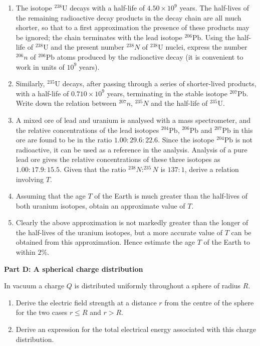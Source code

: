 \begin{enumerate}
\item[(a)] The isotope $^{238}\mathrm{U}$ decays with a half-life of $4.50\times10^{9}$ years. The half-lives of the remaining radioactive decay products in the decay chain are all much shorter, so that to a first approximation the presence of these products may be ignored; the chain terminates with the lead isotope $^{206}\mathrm{Pb}$. Using the half-life of $^{238}\mathrm{U}$ and the present number $^{238}N$ of $^{238}\mathrm{U}$ nuclei, express the number $^{206}n$ of $^{206}\mathrm{Pb}$ atoms produced by the radioactive decay (it is convenient to work in units of $10^{9}$ years).
\item[(b)] Similarly, $^{235}\mathrm{U}$ decays, after passing through a series of shorter-lived products, with a half-life of $0.710\times10^{9}$ years, terminating in the stable isotope $^{207}\mathrm{Pb}$. Write down the relation between $^{207}n$, $^{235}N$ and the half-life of $^{235}\mathrm{U}$.
\item[(c)] A mixed ore of lead and uranium is analysed with a mass spectrometer, and the relative concentrations of the lead isotopes $^{204}\mathrm{Pb}$, $^{206}\mathrm{Pb}$ and $^{207}\mathrm{Pb}$ in this ore are found to be in the ratio $1.00:29.6:22.6$. Since the isotope $^{204}\mathrm{Pb}$ is not radioactive, it can be used as a reference in the analysis. Analysis of a pure lead ore gives the relative concentrations of these three isotopes as $1.00:17.9:15.5$. Given that the ratio $^{238}N:^{235}N$ is $137:1$, derive a relation involving $T$.
\item[(d)] Assuming that the age $T$ of the Earth is much greater than the half-lives of both uranium isotopes, obtain an approximate value of $T$.
\item[(e)] Clearly the above approximation is not markedly greater than the longer of the half-lives of the uranium isotopes, but a more accurate value of $T$ can be obtained from this approximation. Hence estimate the age $T$ of the Earth to within $2\%$.
\end{enumerate}

\textbf{Part D: A spherical charge distribution}

In vacuum a charge $Q$ is distributed uniformly throughout a sphere of radius $R$.

\begin{enumerate}
\item[(a)] Derive the electric field strength at a distance $r$ from the centre of the sphere for the two cases $r\le R$ and $r>R$.
\item[(b)] Derive an expression for the total electrical energy associated with this charge distribution.
\end{enumerate}

